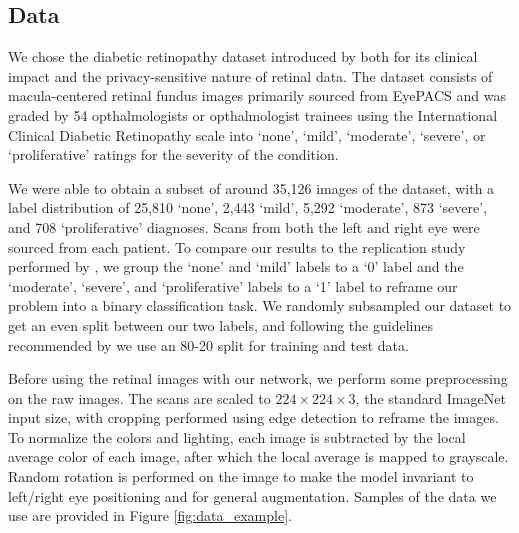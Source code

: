 \documentclass[conference]{IEEEtran}
\begin{document}
\subsection{Data}
We chose the diabetic retinopathy dataset introduced by \cite{gulshan2016development} both for its clinical impact and the privacy-sensitive nature of retinal data.  The dataset consists of macula-centered retinal fundus images primarily sourced from EyePACS and was graded by 54 opthalmologists or opthalmologist trainees using the International Clinical Diabetic Retinopathy scale \cite{severityscale} into `none', `mild', `moderate', `severe', or `proliferative' ratings for the severity of the condition.

We were able to obtain a subset of around 35,126 images of the dataset, with a label distribution of 25,810 `none', 2,443 `mild', 5,292 `moderate', 873 `severe', and 708 `proliferative' diagnoses.  Scans from both the left and right eye were sourced from each patient.  To compare our results to the replication study performed by \cite{replicationstudy}, we group the `none' and `mild' labels to a `0' label and the `moderate', `severe', and `proliferative' labels to a `1' label to reframe our problem into a binary classification task.  We randomly subsampled our dataset to get an even split between our two labels, and following the guidelines recommended by \cite{gulshan2016development} we use an 80-20 split for training and test data.

Before using the retinal images with our network, we perform some preprocessing on the raw images. The scans are scaled to $224 \times 224 \times 3$, the standard ImageNet input size, with cropping performed using edge detection to reframe the images.  To normalize the colors and lighting, each image is subtracted by the local average color of each image, after which the local average is mapped to grayscale.  Random rotation is performed on the image to make the model invariant to left/right eye positioning and for general augmentation.  Samples of the data we use are provided in Figure \ref{fig:data_example}.
\end{document}
